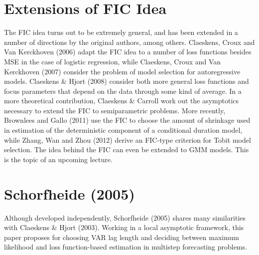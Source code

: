 \section{Extensions of FIC Idea}
The FIC idea turns out to be extremely general, and has been extended in a number of directions by the original authors, among others. 
Claeskens, Croux and Van Kerckhoven (2006) adapt the FIC idea to a number of loss functions besides MSE in the case of logistic regression, while Claeskens, Croux and Van Kerckhoven (2007) consider the problem of model selection for autoregressive models. 
Claeskens \& Hjort (2008) consider both more general loss functions and focus parameters that depend on the data through some kind of average. In a more theoretical contribution, Claeskens \& Carroll work out the asymptotics necessary to extend the FIC to semiparametric problems.
 More recently, Brownlees and Gallo (2011) use the FIC to choose the amount of shrinkage used in estimation of the deterministic component of a conditional duration model, while Zhang, Wan and Zhou (2012) derive an FIC-type criterion for Tobit model selection. 
 The idea behind the FIC can even be extended to GMM models. 
 This is the topic of an upcoming lecture.

\section{Schorfheide (2005)}
Although developed independently, Schorfheide (2005) shares many similarities with Claeskens \& Hjort (2003). 
Working in a local asymptotic framework, this paper proposes for choosing VAR lag length and deciding between maximum likelihood and loss function-based estimation in multistep forecasting problems.



